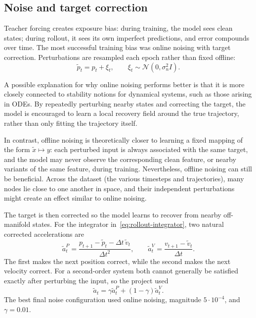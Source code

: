 \documentclass[11pt,a4paper,reqno]{amsart}
\theoremstyle{definition}
\theoremstyle{remark}
\numberwithin{equation}{section}
\begin{document}
\subsection{Noise and target correction}

Teacher forcing creates exposure bias: during training, the model sees clean states; during rollout, it sees its own imperfect predictions, and error compounds over time. The most successful training bias was online noising with target correction. Perturbations are resampled each epoch rather than fixed offline:
\begin{equation}
    \tilde p_t=p_t+\xi_t,
    \qquad
    \xi_t\sim\mathcal N(0,\sigma_n^2 I).
\end{equation}

A possible explanation for why online noising performs better is that it is more closely connected to stability notions for dynamical systems, such as those arising in ODEs. By repeatedly perturbing nearby states and correcting the target, the model is encouraged to learn a local recovery field around the true trajectory, rather than only fitting the trajectory itself.

In contrast, offline noising is theoretically closer to learning a fixed mapping of the form $\tilde{x} \mapsto y$: each perturbed input is always associated with the same target, and the model may never observe the corresponding clean feature, or nearby variants of the same feature, during training. Nevertheless, offline noising can still be beneficial. Across the dataset (the various timesteps and trajectories), many nodes lie close to one another in space, and their independent perturbations might create an effect similar to online noising. 

The target is then corrected so the model learns to recover from nearby off-manifold states. For the integrator in~\eqref{eq:rollout-integrator}, two natural corrected accelerations are
\begin{equation}
    \tilde a_t^P=\frac{p_{t+1}-\tilde p_t-\Delta t\,\tilde v_t}{\Delta t^2},
    \qquad
    \tilde a_t^V=\frac{v_{t+1}-\tilde v_t}{\Delta t}.
\end{equation}
The first makes the next position correct, while the second makes the next velocity correct. For a second-order system both cannot generally be satisfied exactly after perturbing the input, so the project used
\begin{equation}
    \tilde a_t = \gamma\tilde a_t^P+(1-\gamma)\tilde a_t^V.
    \label{eq:noise-correction}
\end{equation}
The best final noise configuration used online noising, magnitude $5\cdot 10^{-4}$, and $\gamma=0.01$.
\end{document}
